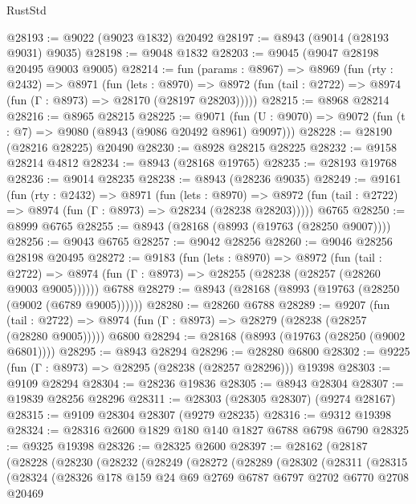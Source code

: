 \begin{lexlean}{RustStd}
\begin{coremodule}
{\begin{coremodule}
{{{{{{{{{{{{{{{{{{{{{{{{{{{{{{{{{{{{{{{@28193 := @9022 (@9023 @1832) @20492
@28197 := @8943 (@9014 (@28193 @9031) @9035)
@28198 := @9048 @1832
@28203 := @9045 (@9047 @28198 @20495 @9003 @9005)
@28214 := fun (params : @8967) =>
  @8969
    (fun (rty : @2432) =>
    @8971
      (fun (lets : @8970) =>
      @8972 (fun (tail : @2722) => @8974 (fun (Γ : @8973) => @28170 (@28197 @28203)))))
@28215 := @8968 @28214
@28216 := @8965 @28215
@28225 := @9071
    (fun (U : @9070) => @9072 (fun (t : @7) => @9080 (@8943 (@9086 @20492 @8961) @9097)))
@28228 := @28190 (@28216 @28225) @20490
@28230 := @8928 @28215 @28225
@28232 := @9158 @28214 @4812
@28234 := @8943 (@28168 @19765)
@28235 := @28193 @19768
@28236 := @9014 @28235
@28238 := @8943 (@28236 @9035)
@28249 := @9161
    (fun (rty : @2432) =>
    @8971
      (fun (lets : @8970) =>
      @8972 (fun (tail : @2722) => @8974 (fun (Γ : @8973) => @28234 (@28238 @28203)))))
    @6765
@28250 := @8999 @6765
@28255 := @8943 (@28168 (@8993 (@19763 (@28250 @9007))))
@28256 := @9043 @6765
@28257 := @9042 @28256
@28260 := @9046 @28256 @28198 @20495
@28272 := @9183
    (fun (lets : @8970) =>
    @8972
      (fun (tail : @2722) =>
      @8974 (fun (Γ : @8973) => @28255 (@28238 (@28257 (@28260 @9003 @9005))))))
    @6788
@28279 := @8943 (@28168 (@8993 (@19763 (@28250 (@9002 (@6789 @9005))))))
@28280 := @28260 @6788
@28289 := @9207
    (fun (tail : @2722) => @8974 (fun (Γ : @8973) => @28279 (@28238 (@28257 (@28280 @9005)))))
    @6800
@28294 := @28168 (@8993 (@19763 (@28250 (@9002 @6801))))
@28295 := @8943 @28294
@28296 := @28280 @6800
@28302 := @9225 (fun (Γ : @8973) => @28295 (@28238 (@28257 @28296))) @19398
@28303 := @9109 @28294
@28304 := @28236 @19836
@28305 := @8943 @28304
@28307 := @19839 @28256 @28296
@28311 := @28303 (@28305 @28307) (@9274 @28167)
@28315 := @9109 @28304 @28307 (@9279 @28235)
@28316 := @9312 @19398
@28324 := @28316 @2600 @1829 @180 @140 @1827 @6788 @6798 @6790
@28325 := @9325 @19398
@28326 := @28325 @2600
@28397 := @28162
    (@28187
      (@28228
        (@28230
          (@28232
            (@28249
              (@28272
                (@28289
                  (@28302
                    (@28311
                      (@28315
                        (@28324
                          (@28326
                            @178
                            @159
                            @24
                            @69
                            @2769
                            @6787
                            @6797
                            @2702
                            @6770
                            @2708
                            @20469
}}}}}}}}}}}}}}}}}}}}}}}}}}}}}}}}}}}}}}}
\end{coremodule}}
\end{coremodule}
\end{lexlean}
